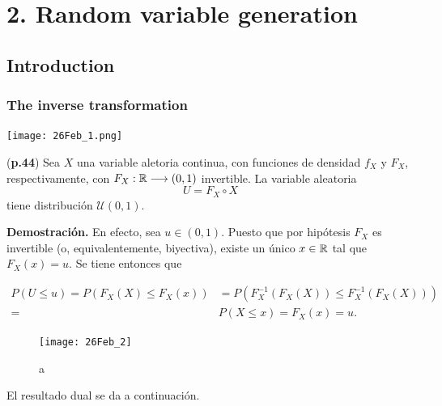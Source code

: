 \chapter{2. Random variable generation}
\section{Introduction}
\subsection{The inverse transformation}
\begin{center}
\begin{marginfigure}
  \centering
  \texttt{[image: 26Feb\_1.png]}
\end{marginfigure}
\end{center}

\begin{teo}
\label{teo: inverse transf, teo 1}
(\textbf{p.44})
Sea $X$ una variable aletoria continua,
con funciones de densidad $f_{X}$ y $F_{X}$, respectivamente,
con $F_{X} : \mathbb{R} \longrightarrow (0,1)$ invertible.
La variable aleatoria
\[
U=F_{X} \circ X
\]
tiene distribución $\mathcal{U}(0,1)$.
\end{teo}

\noindent
\textbf{Demostración.}
En efecto, sea $u \in (0,1)$. Puesto que por hipótesis
$F_{X}$ es invertible (o, equivalentemente,
biyectiva), existe un único $x \in \mathbb{R}$ tal que
$F_{X}(x)=u$. Se tiene entonces que


\begin{align*}
P(U \leq u) = P (F_{X}(X) \leq F_{X}(x)) & =
P(F_{X}^{-1}(F_{X}(X)) \leq F_{X}^{-1}(F_{X}(X))) \\
= & P(X \leq x) = F_{X}(x)=u.
\end{align*}


\begin{figure}[H]
\centering
	\texttt{[image: 26Feb\_2]} 
	\caption{a}
\end{figure}

\QEDB
\vspace{0.2cm}







El resultado dual se da a continuación.

